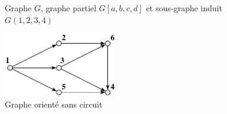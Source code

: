 \documentclass[11pt,a4paper]{report}
\begin{document}
\begin{figure}[htbp]
  \centering
\caption{Graphe $G$, graphe partiel $G[a,b,c,d]$ et sous-graphe induit $G(1,2,3,4)$}\label{fig:sous-graphes}
\end{figure}

\begin{figure}[htbp]
  \centering
\includegraphics[width=5cm]{graphe_oriente}
\caption{Graphe orienté sans circuit}\label{fig:graphes}
\end{figure}
\end{document}
